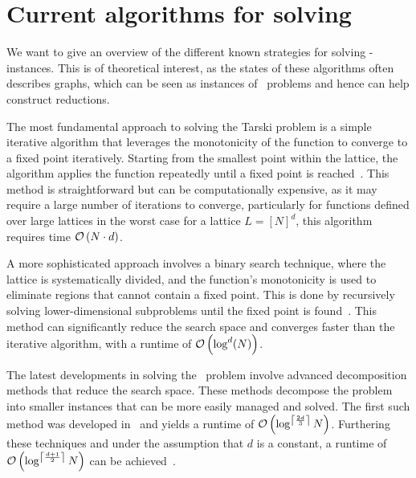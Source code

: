 \section{Current algorithms for solving \Tarski}\label{sec:intro_tarski_algorithms}

We want to give an overview of the different known strategies for solving \Tarski-instances. This is of theoretical interest, as the states of these algorithms often describes graphs, which can be seen as instances of \TFNP\ problems and hence can help construct reductions.

The most fundamental approach to solving the Tarski problem is a simple iterative algorithm that leverages the monotonicity of the function to converge to a fixed point iteratively. Starting from the smallest point within the lattice, the algorithm applies the function repeatedly until a fixed point is reached~. This method is straightforward but can be computationally expensive, as it may require a large number of iterations to converge, particularly for functions defined over large lattices in the worst case for a lattice $L = {[N]}^d$, this algorithm requires time $\mathcal{O}\left(N \cdot d\right)$.

A more sophisticated approach involves a binary search technique, where the lattice is systematically divided, and the function's monotonicity is used to eliminate regions that cannot contain a fixed point. This is done by recursively solving lower-dimensional subproblems until the fixed point is found~. This method can significantly reduce the search space and converges faster than the iterative algorithm, with a runtime of $\mathcal{O}\left(\log^d(N)\right)$.

The latest developments in solving the \Tarski\ problem involve advanced decomposition methods that reduce the search space. These methods decompose the problem into smaller instances that can be more easily managed and solved. The first such method was developed in~\cite{fearnley_faster_2022} and yields a runtime of $\mathcal{O}\left(\log^{\left\lceil\frac{2d}{3}\right\rceil}{N}\right)$. Furthering these techniques and under the assumption that $d$ is a constant, a runtime of $\mathcal{O}\left(\log^{\left\lceil\frac{d+1}{2}\right\rceil}{N}\right)$ can be achieved~.

